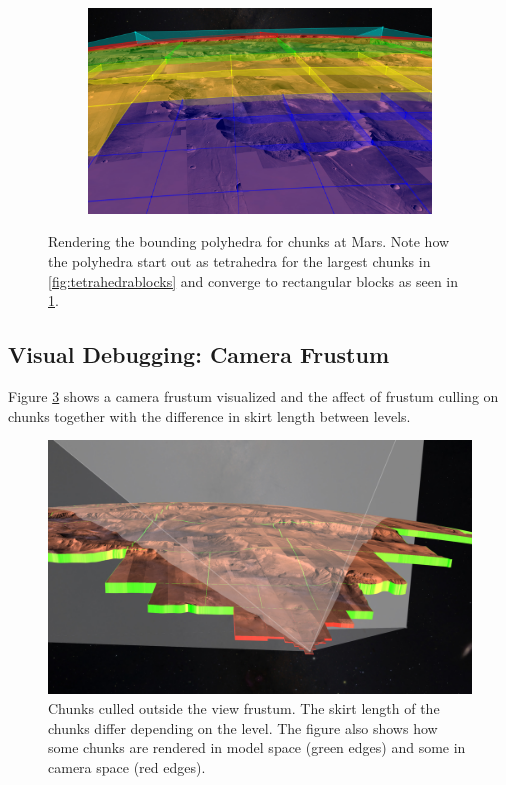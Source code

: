 \begin{figure}[h]
\begin{subfigure}[bt]{0.45\textwidth}
        \caption{}
    \end{subfigure}
    ~
    \begin{subfigure}[bt]{0.45\textwidth}
        \includegraphics[width=\textwidth]{figures/results/screenshots_thesis_old/bounds4.jpg}
        \caption{}
        \label{fig:cuboidblocks}
    \end{subfigure}
    \caption{Rendering the bounding polyhedra for chunks at Mars. Note how the polyhedra start out as tetrahedra for the largest chunks in \ref{fig:tetrahedrablocks} and converge to rectangular blocks as seen in \ref{fig:cuboidblocks}. }
    \label{fig:boundingvolume}
\end{figure}

\clearpage
\subsection{Visual Debugging: Camera Frustum}
\FloatBarrier

Figure \ref{fig:frustummars} shows a camera frustum visualized and the affect of frustum culling on chunks together with the difference in skirt length between levels.

\begin{figure}[h]
    \centering
        \includegraphics[width=\textwidth]{figures/results/screenshots_thesis_old/frustum_mars.jpg}
    \caption{Chunks culled outside the view frustum. The skirt length of the chunks differ depending on the level. The figure also shows how some chunks are rendered in model space (green edges) and some in camera space (red edges).}
    \label{fig:frustummars}
\end{figure}

